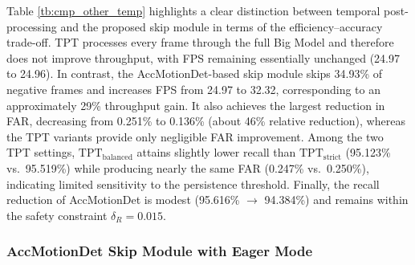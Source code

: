 \documentclass[
  10pt,
]{article}
\begin{document}
Table \ref{tb:cmp_other_temp} highlights a clear distinction between
temporal post-processing and the proposed skip module in terms of the
efficiency--accuracy trade-off. TPT processes every frame through the
full Big Model and therefore does not improve throughput, with FPS
remaining essentially unchanged (24.97 to 24.96). In contrast, the
AccMotionDet-based skip module skips 34.93\% of negative frames and
increases FPS from 24.97 to 32.32, corresponding to an approximately
29\% throughput gain. It also achieves the largest reduction in FAR,
decreasing from 0.251\% to 0.136\% (about 46\% relative reduction),
whereas the TPT variants provide only negligible FAR improvement. Among
the two TPT settings, \(\text{TPT}_\text{balanced}\) attains slightly
lower recall than \(\text{TPT}_\text{strict}\) (95.123\% vs.~95.519\%)
while producing nearly the same FAR (0.247\% vs.~0.250\%), indicating
limited sensitivity to the persistence threshold. Finally, the recall
reduction of AccMotionDet is modest (95.616\% \(\to\) 94.384\%) and
remains within the safety constraint \(\delta_R = 0.015\).

\subsubsection{AccMotionDet Skip Module with Eager
Mode}\label{accmotiondet-skip-module-with-eager-mode}

\begin{table}[hbtp]
    \caption{Representative validation-set grid search results for \textsc{AccMotionDet}
    (optimal configuration from Section~\ref{sec:hyperparam}) augmented
    with \textsc{Eager} mode. The ``Recall (\%)'' column reports retained recall
    with the absolute drop relative to the baseline in parentheses (i.e.,
    Recall $-$ Recall Drop). The best and second-best results per metric are
    highlighted in \textbf{bold} and \textit{\underline{italic underline}},
    respectively.
}
    \label{tb:gridsearch_accMotionDetEager}
\end{table}
\end{document}
